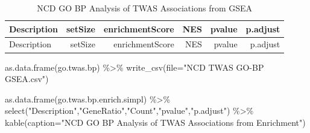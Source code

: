 \documentclass[
]{article}
\newenvironment{Shaded}{\begin{snugshade}}{\end{snugshade}}
\newcommand{\AttributeTok}[1]{\textcolor[rgb]{0.77,0.63,0.00}{#1}}
\newcommand{\FunctionTok}[1]{\textcolor[rgb]{0.00,0.00,0.00}{#1}}
\newcommand{\NormalTok}[1]{#1}
\newcommand{\SpecialCharTok}[1]{\textcolor[rgb]{0.00,0.00,0.00}{#1}}
\newcommand{\StringTok}[1]{\textcolor[rgb]{0.31,0.60,0.02}{#1}}
\begin{document}
\begin{longtable}[]{@{}lrrrrr@{}}
\caption{NCD GO BP Analysis of TWAS Associations from
GSEA}\tabularnewline
\toprule()
Description & setSize & enrichmentScore & NES & pvalue & p.adjust \\
\midrule()
\endfirsthead
\toprule()
Description & setSize & enrichmentScore & NES & pvalue & p.adjust \\
\midrule()
\endhead
\bottomrule()
\end{longtable}

\begin{Shaded}
\begin{Highlighting}[]
\FunctionTok{as.data.frame}\NormalTok{(go.twas.bp) }\SpecialCharTok{\%\textgreater{}\%}
  \FunctionTok{write\_csv}\NormalTok{(}\AttributeTok{file=}\StringTok{"NCD TWAS GO{-}BP GSEA.csv"}\NormalTok{)}

\FunctionTok{as.data.frame}\NormalTok{(go.twas.bp.enrich.simpl) }\SpecialCharTok{\%\textgreater{}\%} \FunctionTok{select}\NormalTok{(}\StringTok{"Description"}\NormalTok{,}\StringTok{"GeneRatio"}\NormalTok{,}\StringTok{"Count"}\NormalTok{,}\StringTok{"pvalue"}\NormalTok{,}\StringTok{"p.adjust"}\NormalTok{) }\SpecialCharTok{\%\textgreater{}\%} 
  \FunctionTok{kable}\NormalTok{(}\AttributeTok{caption=}\StringTok{"NCD GO BP Analysis of TWAS Associations from Enrichment"}\NormalTok{)}
\end{Highlighting}
\end{Shaded}
\end{document}
